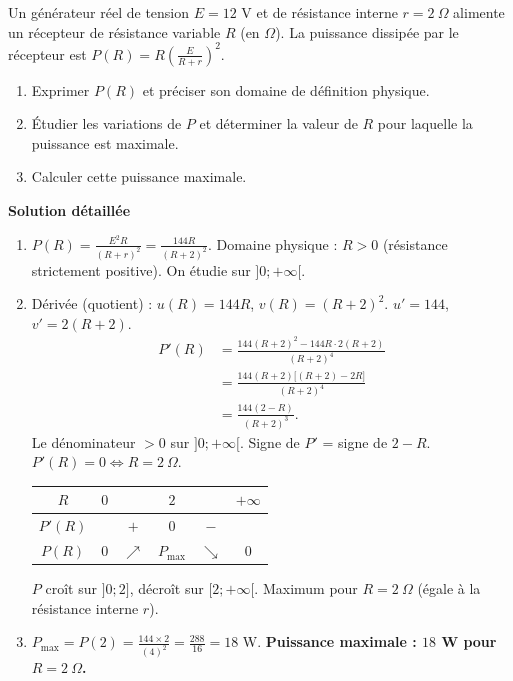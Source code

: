 \documentclass[11pt]{article}
\begin{document}
\begin{exoresolu}
Un générateur réel de tension $E = 12$ V et de résistance interne $r = 2\ \Omega$ alimente un récepteur de résistance variable $R$ (en $\Omega$). La puissance dissipée par le récepteur est $P(R) = R \left(\frac{E}{R+r}\right)^2$.
\begin{enumerate}
    \item Exprimer $P(R)$ et préciser son domaine de définition physique.
    \item Étudier les variations de $P$ et déterminer la valeur de $R$ pour laquelle la puissance est maximale.
    \item Calculer cette puissance maximale.
\end{enumerate}
\tcblower
\textbf{Solution détaillée}
\begin{enumerate}
    \item $P(R) = \frac{E^2 R}{(R+r)^2} = \frac{144 R}{(R+2)^2}$. Domaine physique : $R > 0$ (résistance strictement positive). On étudie sur $]0; +\infty[$.
    
    \item Dérivée (quotient) : $u(R)=144R$, $v(R)=(R+2)^2$. $u'=144$, $v'=2(R+2)$.
    \begin{align*}
    P'(R) &= \frac{144(R+2)^2 - 144R \cdot 2(R+2)}{(R+2)^4} \\
    &= \frac{144(R+2)\big[(R+2) - 2R\big]}{(R+2)^4} \\
    &= \frac{144(2 - R)}{(R+2)^3}.
    \end{align*}
    Le dénominateur $>0$ sur $]0;+\infty[$. Signe de $P'$ = signe de $2-R$.
    $P'(R) = 0 \iff R = 2\ \Omega$.
    \begin{center}
    \begin{tabular}{|c|ccccc|}\hline
    $R$ & $0$ & & $2$ & & $+\infty$ \\ \hline
    $P'(R)$ & & $+$ & $0$ & $-$ & \\ \hline
    $P(R)$ & $0$ & $\nearrow$ & $P_{\text{max}}$ & $\searrow$ & $0$ \\ \hline
    \end{tabular}
    \end{center}
    $P$ croît sur $]0;2]$, décroît sur $[2;+\infty[$. Maximum pour \textbf{$R = 2\ \Omega$} (égale à la résistance interne $r$).
    
    \item $P_{\text{max}} = P(2) = \frac{144 \times 2}{(4)^2} = \frac{288}{16} = 18$ W.
    \textbf{Puissance maximale : $18$ W pour $R = 2\ \Omega$.}
\end{enumerate}
\end{exoresolu}
\end{document}

